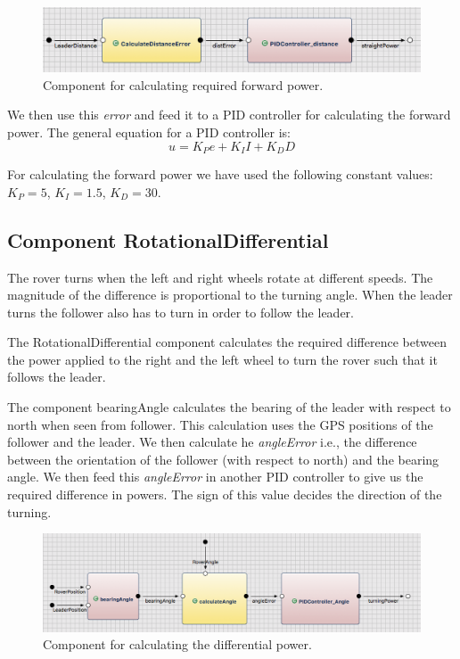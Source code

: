 \begin{figure}[!h]
	\centering
	\includegraphics[width=1\textwidth]{images/straight.png}
	\caption{Component for calculating required forward power.}
	\label{fig:straight}
\end{figure}


We then use this \textit{error} and feed it to a PID controller for calculating the forward power. The general equation for a PID controller is:
\begin{equation}
u = K_Pe + K_II + K_DD
\label{formula:pidController}
\end{equation}

For calculating the forward power we have used the following constant values: $K_P = 5$, $K_I=1.5$, $K_D=30$.


\subsection{Component RotationalDifferential}

The rover turns when the left and right wheels rotate at different speeds. The magnitude of the difference is proportional to the turning angle. When the leader turns the follower also has to turn in order to follow the leader. 

The \textsf{RotationalDifferential} component calculates the required difference between the power applied to the right and the left wheel to turn the rover such that it follows the leader.

The component \textsf{bearingAngle} calculates the bearing of the leader with respect to north when seen from follower. This calculation uses the GPS positions of the follower and the leader. We then calculate he \textit{angleError} i.e., the difference between the orientation of the follower (with respect to north) and the bearing angle. We then feed this \textit{angleError} in another PID controller to give us the required difference in powers. The sign of this value decides the direction of the turning.

\begin{figure}[!h]
	\centering
	\includegraphics[width=1\textwidth]{images/rotation.png}
	\caption{Component for calculating the differential power.}
	\label{fig:rotation}
\end{figure}

